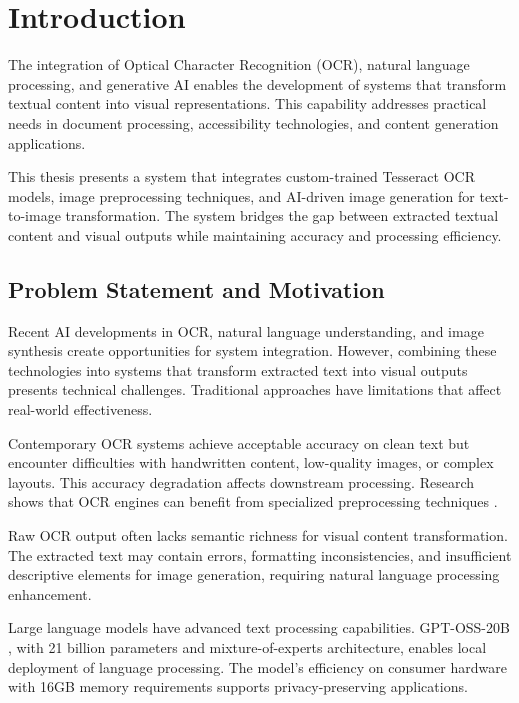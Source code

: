 \chapter{Introduction}

The integration of Optical Character Recognition (OCR), natural language processing, and generative AI enables the development of systems that transform textual content into visual representations. This capability addresses practical needs in document processing, accessibility technologies, and content generation applications.

This thesis presents a system that integrates custom-trained Tesseract OCR models, image preprocessing techniques, and AI-driven image generation for text-to-image transformation. The system bridges the gap between extracted textual content and visual outputs while maintaining accuracy and processing efficiency.

\section{Problem Statement and Motivation}

Recent AI developments in OCR, natural language understanding, and image synthesis create opportunities for system integration. However, combining these technologies into systems that transform extracted text into visual outputs presents technical challenges. Traditional approaches have limitations that affect real-world effectiveness.

Contemporary OCR systems achieve acceptable accuracy on clean text but encounter difficulties with handwritten content, low-quality images, or complex layouts. This accuracy degradation affects downstream processing. Research shows that OCR engines can benefit from specialized preprocessing techniques \cite{esser2020improving}.

Raw OCR output often lacks semantic richness for visual content transformation. The extracted text may contain errors, formatting inconsistencies, and insufficient descriptive elements for image generation, requiring natural language processing enhancement.

Large language models have advanced text processing capabilities. GPT-OSS-20B \cite{openai2025gptoss}, with 21 billion parameters and mixture-of-experts architecture, enables local deployment of language processing. The model's efficiency on consumer hardware with 16GB memory requirements supports privacy-preserving applications.

